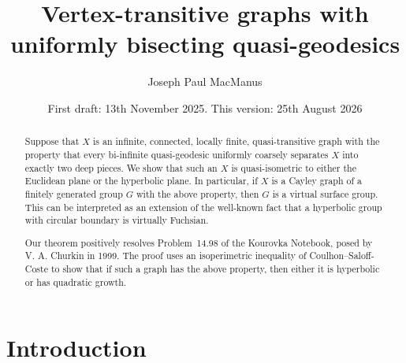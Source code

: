 \documentclass[11pt,a4paper]{amsart}
\title[Transitive graphs with uniformly bisecting quasi-geodesics]{Vertex-transitive graphs with \\ uniformly bisecting quasi-geodesics}
\author{Joseph Paul MacManus}
\date{First draft: 13th November 2025. This version: 25th August 2026}%
\theoremstyle{definition}
\begin{document}
\begin{abstract}
    Suppose that $X$ is an infinite, connected, locally finite, quasi-transitive graph with the property that every bi-infinite quasi-geodesic uniformly coarsely separates $X$ into exactly two deep pieces. We show that such an $X$ is quasi-isometric to either the Euclidean plane or the hyperbolic plane. In particular, if $X$ is a Cayley graph of a finitely generated group $G$ with the above property, then $G$ is a virtual surface group. This can be interpreted as an extension of the well-known fact that a hyperbolic group with circular boundary is virtually Fuchsian. 
    
    Our theorem positively resolves Problem~14.98 of the Kourovka Notebook, posed by V. A. Churkin in 1999.  
    The proof uses an isoperimetric inequality of Coulhon--Saloff-Coste to show that if such a graph has the above property, then either it is hyperbolic or has quadratic growth.
\end{abstract}

\maketitle






\section{Introduction}
\end{document}
